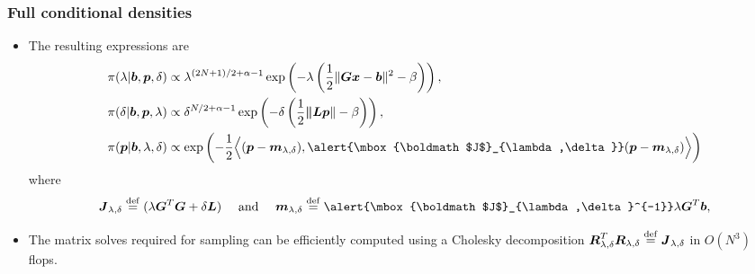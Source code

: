 \documentclass[]{beamer}
\newcommand{\eqdef}{\stackrel{\rm def}{=}}
\newcommand{\bm}[1]{\mbox{\boldmath$#1$}}
\newcommand{\vect}[1]{\bm{#1}}
\begin{document}
\begin{frame}[t]
  \frametitle{Full conditional densities}
  \begin{itemize}
  \itemsep 1.2em
  \item The resulting expressions are
{\small
\begin{align*}
  \pi(\lambda| \vect b,\vect p,\delta) 
  &%
  \propto \lambda^{(2N+1)/2+\alpha-1}\exp\left(-\lambda\left(\frac{1}{2}\|\vect{Gx} - \vect b\|^2 - \beta\right)  \right), \nonumber\\
  \pi(\delta| \vect b,\vect p,\lambda) 
  &%
  \propto \delta^{N/2+\alpha-1}\exp\left(-\delta\left(\frac{1}{2}\vect \|\vect L\vect p \|- \beta\right)  \right), \\
  \pi(\vect p|\vect b,\lambda,\delta) 
    &\propto \exp\left(-\frac 12\Big\langle (\vect p-\vect m_{\lambda,\delta}),\alert{\vect J_{\lambda,\delta}}(\vect p - \vect m_{\lambda,\delta})\Big\rangle\right)
\end{align*}
}
where 
$$
  \vect J_{\lambda,\delta} \eqdef (\lambda \vect G^T\vect G + \delta \vect L) \quad\text{ and }\quad \vect m_{\lambda,\delta} \eqdef \alert{\vect J_{\lambda,\delta}^{-1}}\lambda \vect G^T\vect b,
$$
\item The matrix solves required for sampling can be efficiently computed using a \alert{Cholesky decomposition $\vect R_{\lambda,\delta}^T\vect R_{\lambda,\delta} \eqdef \vect J_{\lambda,\delta}$ in $O(N^3)$ flops}.
 \end{itemize} 

\end{frame}
\end{document}

